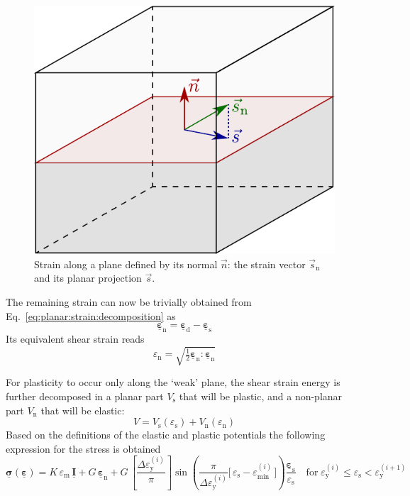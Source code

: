 \documentclass[times,namecite]{goose-article}
\newcommand\T[1]{\underline{\bm{{#1}}}}
\begin{document}
\begin{figure}[htp]
  \centering
  \includegraphics[width=.35\textwidth]{figures/strain-vector-planar}
  \caption{Strain along a plane defined by its normal $\vec{n}$: the strain vector $\vec{s}_\mathrm{n}$ and its planar projection $\vec{s}$.}
  \label{fig:strain-vector-planar}
\end{figure}

The remaining strain can now be trivially obtained from Eq.~\eqref{eq:planar:strain:decomposition} as
\begin{equation}
  \T{\varepsilon}_\mathrm{n} = \T{\varepsilon}_\mathrm{d} - \T{\varepsilon}_\mathrm{s}
\end{equation}
Its equivalent shear strain reads
\begin{equation}
  \varepsilon_\mathrm{n} = \sqrt{ \tfrac{1}{2} \T{\varepsilon}_\mathrm{n} : \T{\varepsilon}_\mathrm{n} }
\end{equation}

For plasticity to occur only along the `weak' plane, the shear strain energy is further decomposed in a planar part $V_\mathrm{s}$ that will be plastic, and a non-planar part $V_\mathrm{n}$ that will be elastic:
\begin{equation}
  V
  =
  V_\mathrm{s} ( \varepsilon_\mathrm{s} )
  +
  V_\mathrm{n} ( \varepsilon_\mathrm{n} )
\end{equation}
Based on the definitions of the elastic and plastic potentials the following expression for the stress is obtained
\begin{equation}
  \T{\sigma} ( \T{\varepsilon} )
  =
  K \, \varepsilon_\mathrm{m} \, \T{I}
  +
  G \, \T{\varepsilon}_\mathrm{n}
  +
  G \,
  \left[ \frac{\Delta \varepsilon_\mathrm{y}^{(i)}}{\pi} \right]
  \sin \left(
    \frac{ \pi }{ \Delta \varepsilon_\mathrm{y}^{(i)} }
    \Big[\, \varepsilon_\mathrm{s} - \varepsilon_\mathrm{min}^{(i)} \,\Big]
  \right)
  \frac{\T{\varepsilon}_\mathrm{s}}{\varepsilon_\mathrm{s}}
  \quad
  \mathrm{for}
  \;
  \varepsilon_\mathrm{y}^{(i)} \leq \varepsilon_\mathrm{s} < \varepsilon_\mathrm{y}^{(i+1)}
\end{equation}



\end{document}
